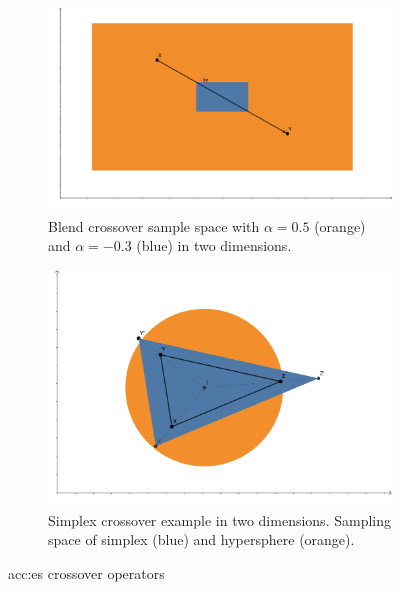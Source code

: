 \begin{figure}
    \begin{subfigure}[t]{0.45\textwidth}
        \includegraphics[width=\textwidth]{img/BLX.pdf}
        \caption{Blend crossover sample space with $\alpha=0.5$ (orange) and $\alpha=-0.3$ (blue) in two dimensions.}
        \label{fig:blendcrossoverexample}
    \end{subfigure}
    \hfill
    \begin{subfigure}[t]{0.45\textwidth}
        \includegraphics[width=\textwidth]{img/SimplexCrossover.pdf}
        \caption{Simplex crossover example in two dimensions. Sampling space of simplex (blue) and hypersphere (orange).}
        \label{fig:simplexcrossoverexample}
    \end{subfigure}
    \caption{\acrshort*{acc:es} crossover operators}
\end{figure}

